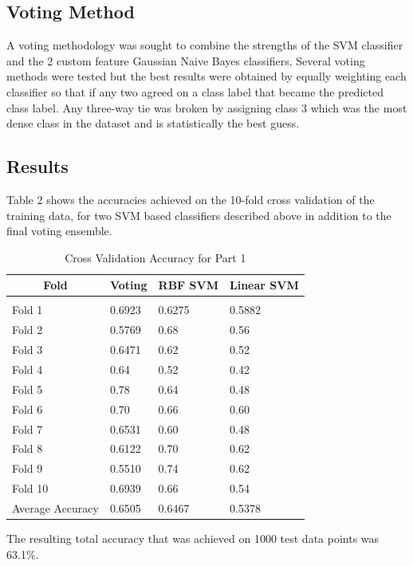 \documentclass{article} %
\begin{document}
\subsection{Voting Method}
A voting methodology was sought to combine the strengths of the SVM classifier and the 2 custom feature Gaussian Naive Bayes classifiers. Several voting methods were tested but the best results were obtained by equally weighting each classifier so that if any two agreed on a class label that became the predicted class label. Any three-way tie was broken by assigning class 3 which was the most dense class in the dataset and is statistically the best guess.
\subsection{Results}

Table 2 shows the accuracies achieved on the 10-fold cross validation of the training data, for two SVM based classifiers described above in addition to the final voting ensemble.

\begin{table}[h]
\caption{Cross Validation Accuracy for Part 1}
\label{classtable}
\begin{center}
	\begin{tabular}{llll}
		\multicolumn{1}{c}{\bf Fold}  &\multicolumn{1}{c}{\bf Voting} &\multicolumn{1}{c}{\bf RBF SVM} &\multicolumn{1}{c}{\bf Linear SVM}
		\\ \hline \\
		Fold 1   &0.6923 &0.6275 &0.5882\\
		Fold 2   &0.5769 &0.68 &0.56\\
		Fold 3   &0.6471 &0.62 &0.52\\
		Fold 4   &0.64   &0.52 &0.42\\
		Fold 5   &0.78   &0.64 &0.48\\
		Fold 6   &0.70   &0.66 &0.60\\
		Fold 7   &0.6531 &0.60 &0.48\\
		Fold 8   &0.6122 &0.70 &0.62\\
		Fold 9   &0.5510 &0.74 &0.62\\
		Fold 10   &0.6939 &0.66 &0.54\\
		Average Accuracy   &0.6505 &0.6467 &0.5378\\
	\end{tabular}
\end{center}
\end{table} 

The resulting total accuracy that was achieved on 1000 test data points was 63.1\%.
\end{document}

